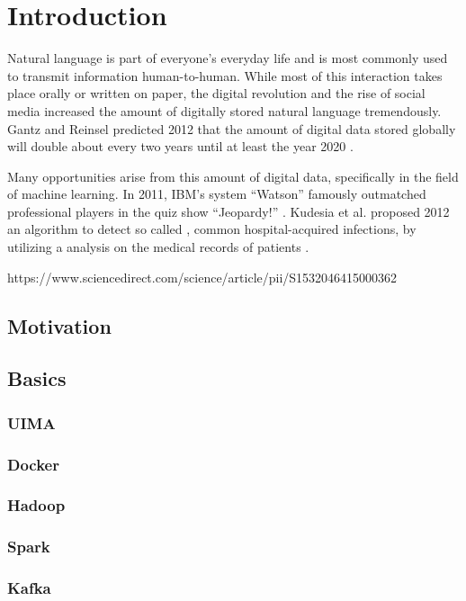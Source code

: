 \chapter{Introduction}

Natural language is part of everyone's everyday life and is most commonly used to transmit information human-to-human. While most of this interaction takes place orally or written on paper, the digital revolution and the rise of social media increased the amount of digitally stored natural language tremendously. Gantz and Reinsel predicted 2012 that the amount of digital data stored globally will double about every two years until at least the year 2020 \cite{gantz2012digital}.

Many opportunities arise from this amount of digital data, specifically in the field of machine learning. In 2011, IBM's \qa{} system ``Watson'' famously outmatched professional players in the quiz show ``Jeopardy!'' \cite{ferrucci2012introduction,epstein2012making}. Kudesia et al. proposed 2012 an algorithm to detect so called \cautis{}, common hospital-acquired infections, by utilizing a \nlp{} analysis on the medical records of patients \cite{kudesia2012natural}.

https://www.sciencedirect.com/science/article/pii/S1532046415000362

\section{Motivation}

\section{Basics}



\subsection{UIMA}
\subsection{Docker}
\subsection{Hadoop}
\subsection{Spark}
\subsection{Kafka}

